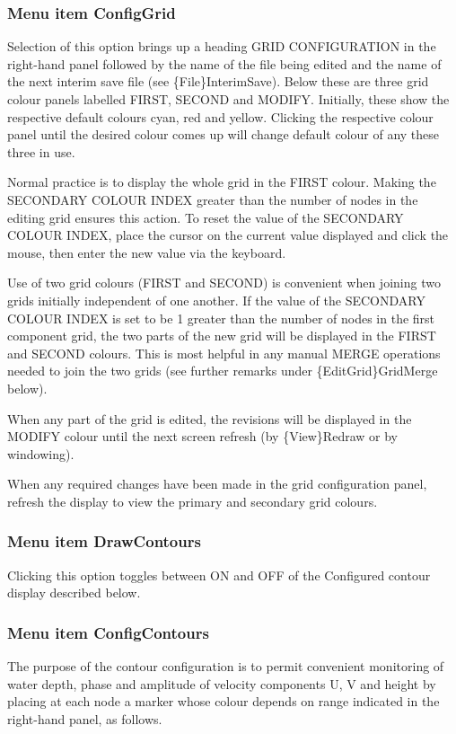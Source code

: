 \documentclass{article}
\begin{document}
\subsubsection[Menu item ConfigGrid]{Menu item ConfigGrid}
Selection of this option brings up a heading GRID CONFIGURATION in the right-hand panel followed by the name of the file being edited and the name of the next interim save file (see \{File\}InterimSave). Below these are three grid colour panels labelled FIRST, SECOND and MODIFY. Initially, these show the respective default colours cyan, red and yellow. Clicking the respective colour panel until the desired colour comes up will change default colour of any these three in use.

Normal practice is to display the whole grid in the FIRST colour. Making the SECONDARY COLOUR INDEX greater than the number of nodes in the editing grid ensures this action. To reset the value of the SECONDARY COLOUR INDEX, place the cursor on the current value displayed and click the mouse, then enter the new value via the keyboard.

Use of two grid colours (FIRST and SECOND) is convenient when joining two grids initially independent of one another. If the value of the SECONDARY COLOUR INDEX is set to be 1 greater than the number of nodes in the first component grid, the two parts of the new grid will be displayed in the FIRST and SECOND colours. This is most helpful in any manual MERGE operations needed to join the two grids (see further remarks under \{EditGrid\}GridMerge below).

When any part of the grid is edited, the revisions will be displayed in the MODIFY colour until the next screen refresh (by \{View\}Redraw or by windowing).

When any required changes have been made in the grid configuration panel, refresh the display to view the primary and secondary grid colours.

\subsubsection[Menu item DrawContours]{Menu item DrawContours}
Clicking this option toggles between ON and OFF of the Configured contour display described below.

\subsubsection[Menu item ConfigContours]{Menu item ConfigContours}
The purpose of the contour configuration is to permit convenient monitoring of water depth, phase and amplitude of velocity components U, V and height by placing at each node a marker whose colour depends on range indicated in the right-hand panel, as follows.
\end{document}
